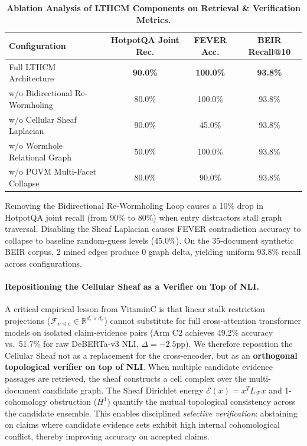 \documentclass[11pt,a4paper]{article}
\begin{document}
\begin{table}[h]
\centering
\small
\caption{\textbf{Ablation Analysis of LTHCM Components on Retrieval \& Verification Metrics.}}
\label{tab:ablation}
\vspace{0.5em}
\begin{tabular}{lccc}
\toprule
\textbf{Configuration} & \textbf{HotpotQA Joint Rec.} & \textbf{FEVER Acc.} & \textbf{BEIR Recall@10} \\
\midrule
Full LTHCM Architecture & \textbf{90.0\%} & \textbf{100.0\%} & \textbf{93.8\%} \\
w/o Bidirectional Re-Wormholing & 80.0\% & 100.0\% & 93.8\% \\
w/o Cellular Sheaf Laplacian & 90.0\% & 45.0\% & 93.8\% \\
w/o Wormhole Relational Graph & 50.0\% & 100.0\% & 93.8\% \\
w/o POVM Multi-Facet Collapse & 80.0\% & 90.0\% & 93.8\% \\
\bottomrule
\end{tabular}
\end{table}

Removing the Bidirectional Re-Wormholing Loop causes a 10\% drop in HotpotQA joint recall (from 90\% to 80\%) when entry distractors stall graph traversal. Disabling the Sheaf Laplacian causes FEVER contradiction accuracy to collapse to baseline random-guess levels (45.0\%). On the 35-document synthetic BEIR corpus, 2 mined edges produce 0 graph delta, yielding uniform 93.8\% recall across configurations.

\paragraph{Repositioning the Cellular Sheaf as a Verifier on Top of NLI.}
A critical empirical lesson from VitaminC is that linear stalk restriction projections ($\mathcal{F}_{v \unlhd e} \in \mathbb{R}^{d_e \times d_v}$) cannot substitute for full cross-attention transformer models on isolated claim-evidence pairs (Arm C2 achieves 49.2\% accuracy vs.\ 51.7\% for raw DeBERTa-v3 NLI, $\Delta = -2.5$pp). We therefore reposition the Cellular Sheaf not as a replacement for the cross-encoder, but as an \textbf{orthogonal topological verifier on top of NLI}. When multiple candidate evidence passages are retrieved, the sheaf constructs a cell complex over the multi-document candidate graph. The Sheaf Dirichlet energy $\mathcal{E}(x) = x^T L_{\mathcal{F}} x$ and 1-cohomology obstruction ($H^1$) quantify the mutual topological consistency across the candidate ensemble. This enables disciplined \emph{selective verification}: abstaining on claims where candidate evidence sets exhibit high internal cohomological conflict, thereby improving accuracy on accepted claims.
\end{document}
